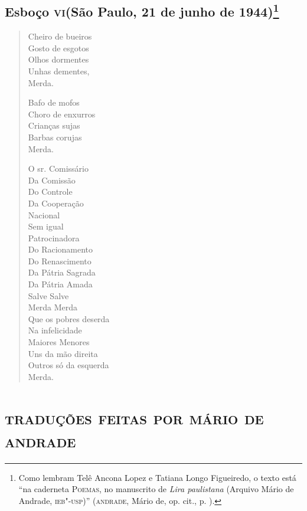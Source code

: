 \pagebreak
\section[Esboço \textsc{vi}]{Esboço \textsc{vi}\break(São Paulo, 21 de junho de 1944)\footnote[*]{Como lembram Telê Ancona Lopez e Tatiana
  Longo Figueiredo, o texto está ``na caderneta \textsc{Poemas}, no
  manuscrito de \emph{Lira paulistana} (Arquivo Mário de Andrade,
  \textsc{ieb"-usp})'' (\textsc{andrade}, Mário de, op. cit., p. ).}}

\begin{verse}
Cheiro de bueiros\\
Gosto de esgotos\\
Olhos dormentes\\
Unhas dementes,\\
Merda.

Bafo de mofos\\
Choro de enxurros\\
Crianças sujas\\
Barbas corujas\\
Merda.

O sr. Comissário\\
Da Comissão\\
Do Controle\\
Da Cooperação\\
Nacional\\
Sem igual\\
Patrocinadora\\
Do Racionamento\\
Do Renascimento\\
Da Pátria Sagrada\\
Da Pátria Amada\\
Salve Salve\\
Merda Merda\\
Que os pobres deserda\\
Na infelicidade\\
Maiores Menores\\
Uns da mão direita\\
Outros só da esquerda\\
Merda.
\end{verse}

\chapter{\textsc{traduções feitas por mário de andrade}}


